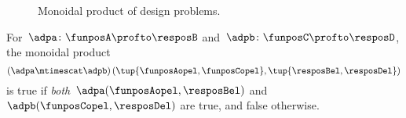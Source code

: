\begin{figure}[h!]
    \centering
    \caption{Monoidal product of design problems.}
    \label{fig:dpmonoidal}
\end{figure}

\begin{remark}
    For~$\adpa \colon \funposA\profto \resposB$ and~$\adpb \colon \funposC \profto \resposD$, the monoidal product
    \begin{equation}
        \left(\adpa \mtimescat \adpb\right)(\tup{\funposAopel, \funposCopel}, \tup{\resposBel,\resposDel})
    \end{equation}
    is true if \emph{both}~$\adpa(\funposAopel,\resposBel)$ and~$\adpb(\funposCopel,\resposDel)$ are true, and false otherwise.
\end{remark}

